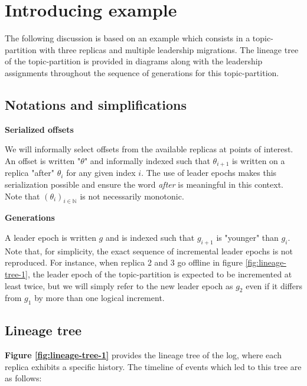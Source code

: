 \documentclass{article}
\begin{document}
\section{Introducing example}

The following discussion is based on an example which consists in a topic-partition with three replicas and multiple leadership migrations. The lineage tree of the topic-partition is provided in diagrams along with the leadership assignments throughout the sequence of generations for this topic-partition.

\subsection{Notations and simplifications}

\textbf{Serialized offsets}

We will informally select offsets from the available replicas at points of interest. An offset is written "$\theta$" and informally indexed such that $\theta_{i+1}$ is written on a replica "after" $\theta_i$ for any given index $i$. The use of leader epochs makes this serialization possible and ensure the word \textit{after} is meaningful in this context. Note that $(\theta_i)_{i \in \mathbb{N}}$ is not necessarily monotonic. 

\textbf{Generations}

A leader epoch is written $g$ and is indexed such that $g_{i+1}$ is "younger" than $g_i$. Note that, for simplicity, the exact sequence of incremental leader epochs is not reproduced. For instance, when replica 2 and 3 go offline in figure \ref{fig:lineage-tree-1}, the leader epoch of the topic-partition is expected to be incremented at least twice, but we will simply refer to the new leader epoch as $g_2$ even if it differs from $g_1$ by more than one logical increment.

\subsection{Lineage tree}

\label{lineage_tree}
\textbf{Figure \ref{fig:lineage-tree-1}} provides the lineage tree of the log, where each replica exhibits a specific history.
The timeline of events which led to this tree are as follows:
\end{document}
